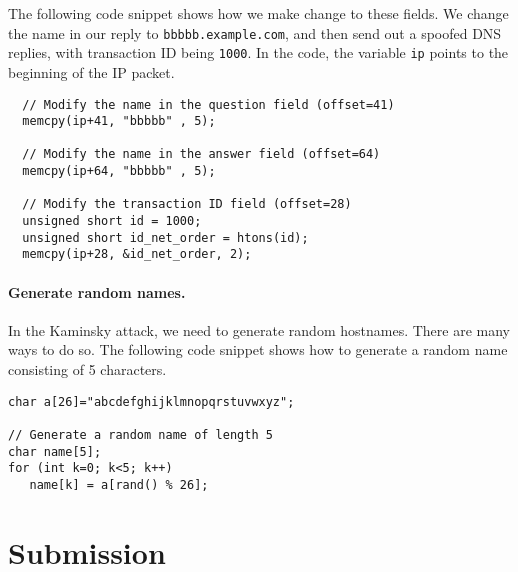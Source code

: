 The following code snippet shows how we make change to these fields. We change
the name in our reply to \texttt{bbbbb.example.com}, and then send out a
spoofed DNS replies, with transaction ID being \texttt{1000}.
In the code, the variable \texttt{ip} points to the beginning of the IP packet.  

\begin{lstlisting}
  // Modify the name in the question field (offset=41)
  memcpy(ip+41, "bbbbb" , 5);

  // Modify the name in the answer field (offset=64)
  memcpy(ip+64, "bbbbb" , 5);

  // Modify the transaction ID field (offset=28)
  unsigned short id = 1000;
  unsigned short id_net_order = htons(id);
  memcpy(ip+28, &id_net_order, 2);
\end{lstlisting}



\paragraph{Generate random names.} In the Kaminsky attack, we need to 
generate random hostnames. There are many ways to do so. The following 
code snippet shows how to generate a random name consisting of 
5 characters. 

\begin{lstlisting}
char a[26]="abcdefghijklmnopqrstuvwxyz";

// Generate a random name of length 5
char name[5];
for (int k=0; k<5; k++)  
   name[k] = a[rand() % 26];
\end{lstlisting}
 



\section{Submission}





\thispagestyle{empty}

\def\baselinestretch{1}








